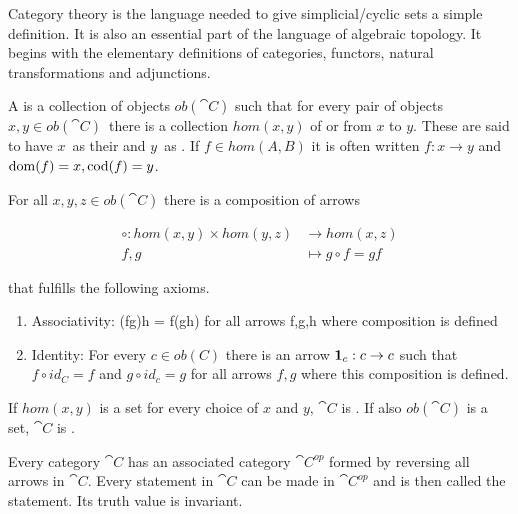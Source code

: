 \documentclass[../../main.tex]{subfiles}
\begin{document}
    Category theory is the language needed to give simplicial/cyclic sets a simple definition. It is also an essential part of the language of algebraic topology. It begins with the elementary definitions of categories, functors, natural transformations and adjunctions.

    \begin{definition}
        A  is a collection of objects $ob(\cat{C})$ such that for every pair of objects $x, y \in ob(\cat{C})$ there is a collection $hom(x, y)$ of  or  from $x$ to $y$. These are said to have $x$ as their  and $y$ as . If $f \in hom(A, B)$ it is often written $f: x \to y$ and $\domain{f} = x, \codomain{f} = y$.
        
        For all $x, y, z \in ob(\cat{C})$ there is a composition of arrows 
        
        \begin{align*}
            \circ: hom(x, y) \times hom(y, z) &\to hom(x, z) \\ 
            f, g &\mapsto g \circ f = gf
        \end{align*}
        
        that fulfills the following axioms.

        \begin{enumerate}
            \item Associativity: (fg)h = f(gh) for all arrows f,g,h where composition is defined
            \item Identity: For every $c \in ob(C)$ there is an arrow $\idarrow[c]: c \to c$ such that $f \circ id_C = f$ and $g \circ id_c = g$ for all arrows $f, g$ where this composition is defined.
        \end{enumerate}
    \end{definition}

    \begin{definition}
        If $hom(x, y)$ is a set for every choice of $x$ and $y$, $\cat{C}$ is . If also $ob(\cat{C})$ is a set, $\cat{C}$ is .
    \end{definition}
    
    Every category $\cat{C}$ has an associated category $\cat{C^{op}}$ formed by reversing all arrows in $\cat{C}$. Every statement in $\cat{C}$ can be made in $\cat{C^{op}}$ and is then called the  statement. Its truth value is invariant.
\end{document}
